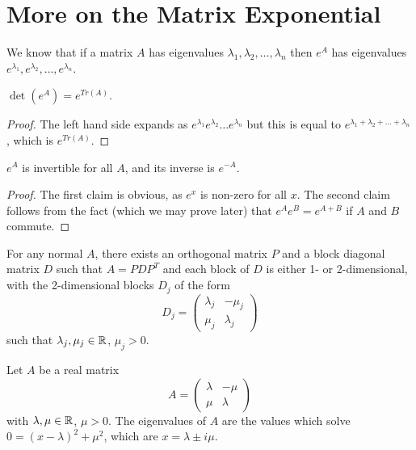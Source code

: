 
\section*{More on the Matrix Exponential}

We know that if a matrix $A$ has eigenvalues $\lambda_1,\lambda_2,\dots,\lambda_n$ then $e^A$ has eigenvalues $e^{\lambda_1},e^{\lambda_2},\dots,e^{\lambda_n}$.

\begin{claim}
	$\det(e^A)=e^{Tr(A)}$.
\end{claim}
\begin{proof}
	The left hand side expands as $e^{\lambda_1} e^{\lambda_2} \dots e^{\lambda_n}$ but this is equal to $e^{\lambda_1 + \lambda_2+\dots+\lambda_n}$, which is $e^{Tr(A)}$.
\end{proof}
\begin{corollary}
	$e^A$ is invertible for all $A$, and its inverse is $e^{-A}$.
\end{corollary}
\begin{proof}
	The first claim is obvious, as $e^x$ is non-zero for all $x$.  The second claim follows from the fact (which we may prove later) that $e^Ae^B=e^{A+B}$ if $A$ and $B$ commute.
\end{proof}





\begin{theorem}
	For any normal $A$, there exists an orthogonal matrix $P$ and a block diagonal matrix $D$ such that $A=PDP^T$ and each block of $D$ is either 1- or 2-dimensional, with the 2-dimensional blocks $D_j$ of the form $$D_j=\begin{pmatrix}
	\lambda_j&-\mu_j\\\mu_j&\lambda_j\end{pmatrix}$$ such that $\lambda_j,\mu_j\in\mathbb{R}$, $\mu_j>0$.

\end{theorem} 

Let $A$ be a real matrix $$A=\begin{pmatrix}
\lambda&-\mu\\\mu&\lambda
\end{pmatrix}$$ with $\lambda,\mu\in\mathbb{R}$, $\mu>0$.  The eigenvalues of $A$ are the values which solve $0=(x-\lambda)^2+\mu^2$, which are $x=\lambda\pm i\mu$.
	
	
	
	
	
	
